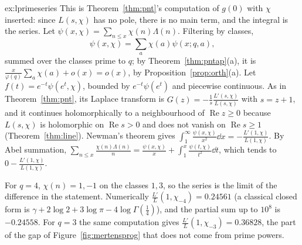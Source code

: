 \begin{solution}{ex:lprimeseries}
\idea This is Theorem~\ref{thm:pnt}'s computation of $g(0)$ with $\chi$ inserted: since $L(s,\chi)$ has no pole, there is no main term, and the integral is the series.
\writeup Let $\psi(x,\chi)=\sum_{n\le x}\chi(n)\Lambda(n)$. Filtering by classes,
\[
\psi(x,\chi)=\sum_a\chi(a)\psi(x;q,a),
\]
summed over the classes prime to $q$; by Theorem~\ref{thm:pntap}(a), it is
$\frac x{\varphi(q)}\sum_a\chi(a)+o(x)=o(x)$, by Proposition~\ref{prop:orth}(a). Let $f(t)=e^{-t}\psi(e^t,\chi)$, bounded by $e^{-t}\psi(e^t)$ and piecewise continuous. As in Theorem~\ref{thm:pnt},
its Laplace transform is $G(z)=-\frac1s\frac{L'(s,\chi)}{L(s,\chi)}$ with $s=z+1$, and it continues holomorphically to a neighbourhood of $\operatorname{Re}z\ge0$ because $L(s,\chi)$ is holomorphic on
$\operatorname{Re}s>0$ and does not vanish on $\operatorname{Re}s\ge1$ (Theorem~\ref{thm:line}). Newman's theorem gives $\int_1^\infty\frac{\psi(x,\chi)}{x^2}\dd x=-\frac{L'(1,\chi)}{L(1,\chi)}$. By Abel summation,
$\sum_{n\le x}\frac{\chi(n)\Lambda(n)}n=\frac{\psi(x,\chi)}x+\int_1^x\frac{\psi(t,\chi)}{t^2}\dd t$, which tends to $0-\frac{L'(1,\chi)}{L(1,\chi)}$.

For $q=4$, $\chi(n)=1,-1$ on the classes $1,3$, so the series is the limit of the difference in the statement. Numerically $\frac{L'}L(1,\chi_{-4})=0.24561$ (a classical closed form is
$\gamma+2\log2+3\log\pi-4\log\Gamma(\frac14)$), and the partial sum up to $10^8$ is $-0.24558$. For $q=3$ the same computation gives $\frac{L'}L(1,\chi_{-3})=0.36828$, the part of the gap of
Figure~\ref{fig:mertensprog} that does not come from prime powers.
\end{solution}

